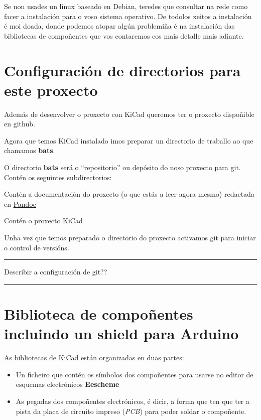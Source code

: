 Se non usades un linux baseado en Debian, teredes que consultar na rede
como facer a instalación para o voso sistema operativo. De todolos
xeitos a instalación é moi doada, donde podemos atopar algún problemiña
é na instalación das bibliotecas de compoñentes que vos contaremos cos
mais detalle mais adiante.

\section{Configuración de directorios para este
proxecto}\label{configuraciuxf3n-de-directorios-para-este-proxecto}

Además de desenvolver o proxecto con KiCad queremos ter o proxecto
dispoñible en github.

Agora que temos KiCad instalado imos preparar un directorio de traballo
ao que chamamos \textbf{bats}.

O directorio \textbf{bats} será o ``repositorio'' ou depósito do noso
proxecto para git. Contén os seguintes subdirectorios:

\begin{description}
\itemsep1pt\parskip0pt
\item[doc]
Contén a documentación do proxecto (o que estás a leer agora mesmo)
redactada en \href{http://pandoc.org/}{Pandoc}
\item[kicad]
Contén o proxecto KiCad
\end{description}

Unha vez que temos preparado o directorio do proxecto activamos git para
iniciar o control de versións.

\begin{center}\rule{0.5\linewidth}{\linethickness}\end{center}

Describir a configuración de git??

\begin{center}\rule{0.5\linewidth}{\linethickness}\end{center}

\section{Biblioteca de compoñentes incluindo un shield para
Arduino}\label{biblioteca-de-compouxf1entes-incluindo-un-shield-para-arduino}

As bibliotecas de KiCad están organizadas en duas partes:

\begin{itemize}
\item
  Un ficheiro que contén os símbolos dos compoñentes para usarse no
  editor de esquemas electrónicos \textbf{Eescheme}
\item
  As pegadas dos compoñentes electrónicos, é dicir, a forma que ten que
  ter a pista da placa de circuito impreso (\emph{PCB}) para poder
  soldar o compoñente.
\end{itemize}

